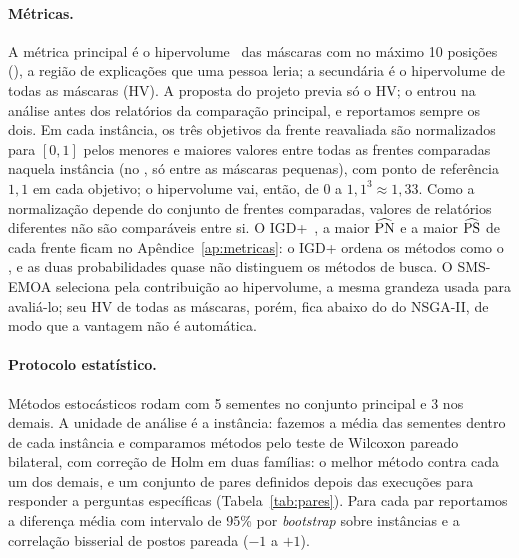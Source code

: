 \paragraph{Métricas.}
A métrica principal é o hipervolume~\cite{zitzler1999spea} das máscaras com no
máximo 10 posições (\HVp), a região de explicações que uma pessoa leria; a
secundária é o hipervolume de todas as máscaras (HV). A proposta do projeto
previa só o HV; o \HVp{} entrou na análise antes dos relatórios da comparação
principal, e reportamos sempre os dois. Em cada instância, os três
objetivos da frente reavaliada são normalizados para $[0,1]$ pelos menores e
maiores valores entre todas as frentes comparadas naquela instância (no \HVp,
só entre as máscaras pequenas), com ponto de referência $1{,}1$ em cada
objetivo; o hipervolume vai, então, de 0 a $1{,}1^3\approx1{,}33$. Como a
normalização depende do conjunto de frentes comparadas, valores de relatórios
diferentes não são comparáveis entre si. O IGD+~\cite{ishibuchi2015igdplus}, a
maior $\widehat{\mathrm{PN}}$ e a maior $\widehat{\mathrm{PS}}$ de cada frente ficam no
Apêndice~\ref{ap:metricas}: o IGD+ ordena os métodos como o \HVp{}, e as duas
probabilidades quase não distinguem os métodos de busca. O SMS-EMOA seleciona
pela contribuição ao hipervolume, a mesma grandeza usada para avaliá-lo; seu
HV de todas as máscaras, porém, fica abaixo do do NSGA-II, de modo que a
vantagem não é automática.

\paragraph{Protocolo estatístico.}
Métodos estocásticos rodam com 5 sementes no conjunto principal e 3 nos
demais. A unidade de análise é a instância: fazemos a média das sementes dentro
de cada instância e comparamos métodos pelo teste de Wilcoxon pareado
bilateral, com correção de Holm em duas famílias: o melhor método contra cada
um dos demais, e um conjunto de pares definidos depois das execuções para
responder a perguntas específicas (Tabela~\ref{tab:pares}). Para cada par
reportamos a diferença média com intervalo de 95\% por \emph{bootstrap} sobre
instâncias e a correlação bisserial de postos pareada ($-1$ a $+1$).

